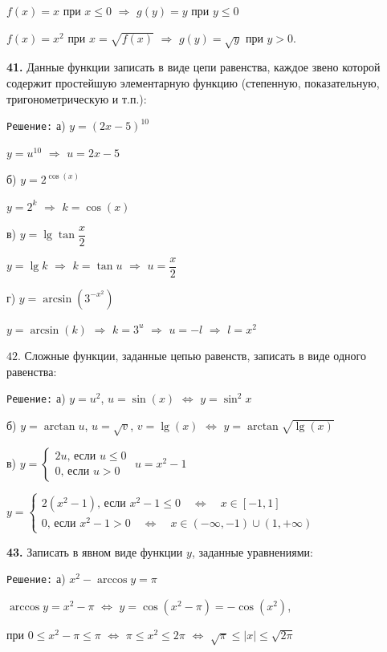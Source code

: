 \documentclass[12pt]{article}
\begin{document}
	$f(x) = x$ при $x\le 0$ $\Rightarrow$ $g(y) = y$ при $y\le 0$
	
	$f(x) = x^2$ при $x = \sqrt{f(x)}$ $\Rightarrow$ $g(y) = \sqrt{y}$ при $y>0$.
	\medskip
	
	{\bf 41.} Данные функции записать в виде цепи равенства, каждое звено которой содержит простейшую элементарную функцию (степенную, показательную, тригонометрическую и т.п.):
	
	{\tt Решение:} а) $y=(2x-5)^{10}$
	
	$y=u^{10}$ $\Rightarrow$ $u = 2x-5$
	
	\quad б) $y=2^{\cos(x)}$
	
	$y = 2^k$ $\Rightarrow$ $k = \cos(x)$
	
	\quad в) $y=\lg\tan\dfrac{x}{2}$
	
	$y =\lg k$ $\Rightarrow$ $k = \tan u$ $\Rightarrow$ $u = \dfrac{x}{2}$
	
	\quad г) $y= \arcsin(3^{-x^2})$
	
	$y = \arcsin(k)$ $\Rightarrow$ $k = 3^u$ $\Rightarrow$ $u = -l$ $\Rightarrow$ $l = x^2$
	\medskip
	
	$42.$ Сложные функции, заданные цепью равенств, записать в виде одного равенства:
	
	{\tt Решение:} а) $y=u^2$, $u=\sin(x)$ $\Leftrightarrow$ $y = \sin^2 x$
	
	\quad б) $y= \arctan u$, $u=\sqrt{v}$, $v=\lg(x)$ $\Leftrightarrow$ $y=\arctan\sqrt{\lg(x)}$
	
	\quad	в) 	
	$y = \begin{cases}
	2u \text{, если } u\le 0 \\
	0 \text{, если } u>0
	\end{cases}$ \qquad $u=x^2-1$
	
	$
		y = \begin{cases}
		2(x^2-1) \text{, если } x^2-1\le0 \quad\Leftrightarrow\quad x\in[-1,1] \\
		0 \text{, если } x^2-1>0 \quad\Leftrightarrow\quad x\in(-\infty,-1)\cup(1,+\infty)
		\end{cases}
	$
	\medskip
	
	{\bf 43.} Записать в явном виде функции $y$, заданные уравнениями:
	
	{\tt Решение:} а) $x^2 -\arccos y =\pi$
	
	$\arccos y = x^2 -\pi$ $\Leftrightarrow$ $y= \cos(x^2-\pi) = -\cos(x^2)$, 
	
	при $0\le x^2-\pi\le \pi$ $\Leftrightarrow$ $\pi \le x^2 \le 2\pi$ $\Leftrightarrow$ $\sqrt{\pi} \le |x| \le \sqrt{2\pi}$
	
\end{document}
